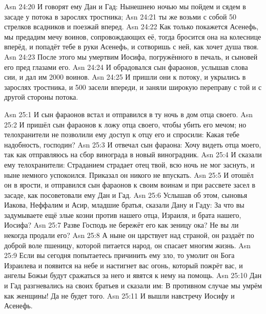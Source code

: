 \vs Asn 24:20
И говорят ему Дан и Гад:
Нынешнею ночью мы пойдем и сядем в засаде у потока в зарослях тростника;
\vs Asn 24:21
ты же возьми с собой 50 стрелков всадников и поезжай вперед.
\vs Asn 24:22
Как только покажется
Асенефь, мы предадим мечу воинов, сопровождающих её, тогда бросится она на
колеснице вперёд, и попадёт тебе в руки Асенефь, и сотворишь с ней, как хочет
душа твоя.
\vs Asn 24:23
После этого мы умертвим
Иосифа, погружённого в печаль, и сыновей его пред глазами его.
\vs Asn 24:24
И обрадовался сын фараонов,
услышав слова сии, и дал им 2000 воинов.
\vs Asn 24:25
И пришли они к потоку, и
укрылись в зарослях тростника, и 500 засели впереди, и заняли широкую
переправу с той и с другой стороны потока.

\vs Asn 25:1
И сын фараонов встал и отправился в ту ночь в дом отца своего.
\vs Asn 25:2
И пришёл сын фараонов к ложу
отца своего, чтобы убить его мечом; но телохранители не позволили ему доступ к
отцу его и спросили: Какая тебе надобность, господин?
\vs Asn 25:3
И отвечал сын фараона: Хочу
видеть отца моего, так как отправляюсь на сбор винограда в новый виноградник.
\vs Asn 25:4
И сказали ему телохранители:
Страданием страдает отец твой, всю ночь не мог заснуть, и ныне немного
успокоился. Приказал он никого не впускать.
\vs Asn 25:5
И отошёл он в ярости, и
отправился сын фараонов к своим воинам и при рассвете засел в засаде, как
посоветовали ему Дан и Гад.
\vs Asn 25:6
Услышав об этом, сыновья
Иакова, Неффалим и Асир, младшие братья, сказали Дану и Гаду: За что вы
задумываете ещё злые козни против нашего отца, Израиля, и брата нашего, Иосифа?
\vs Asn 25:7
Разве Господь не бережёт его
как зеницу ока? Не вы ли некогда продали его?
\vs Asn 25:8
А ныне он царствует над
страной, он раздаёт по доброй воле пшеницу, которой питается народ, он спасает
многим жизнь.
\vs Asn 25:9
Если вы сегодня попытаетесь
причинить ему зло, то умолит он Бога Израилева и появится на небе и настигнет
вас огонь, который пожрёт вас, и ангелы Божьи будут сражаться за него и явятся к
нему на помощь.
\vs Asn 25:10
Дан и Гад разгневались на
своих братьев и сказали им: В противном случае мы умрём как женщины!
Да не будет того.
\vs Asn 25:11
И вышли навстречу Иосифу и Асенефь.

